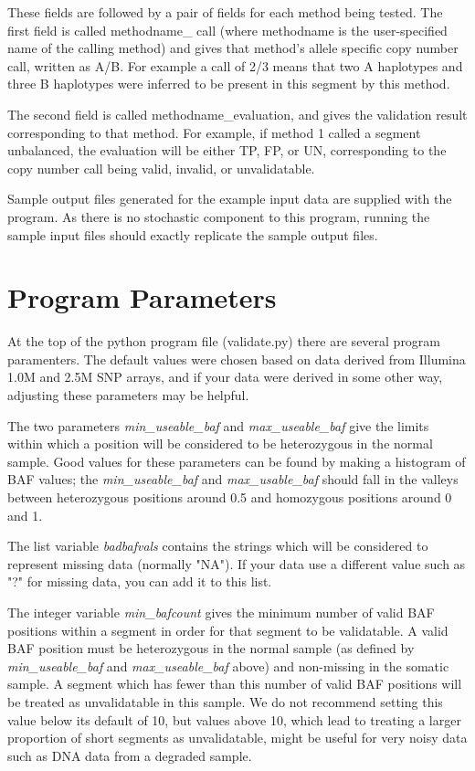 \documentclass{article}
\begin{document}
These fields are followed by a pair of fields for each method being
tested.  The first field is called methodname\_ call (where
methodname is the user-specified name of the calling method) 
and gives that method's allele specific copy
number call, written as A/B.  For example a call of 2/3 means that two
A haplotypes and three B haplotypes were inferred to be present in
this segment by this method.

The second field is called methodname\_evaluation,
and gives the
validation result corresponding to that method.  For example, if
method 1 called a segment unbalanced, the evaluation will
be either TP, FP, or UN, corresponding to the copy number call being
valid, invalid, or unvalidatable.

Sample output files generated for the example input data are supplied
with the program.  As there is no stochastic component to this
program, running the sample input files should exactly replicate the
sample output files.

\section*{Program Parameters}

At the top of the python program file (validate.py) there are several 
program paramenters.
The default values were chosen based
on data derived from Illumina 1.0M and 2.5M SNP arrays, and if your
data were derived in some other way, adjusting these parameters may
be helpful.

The two parameters {\it min\_useable\_baf} and {\it max\_useable\_baf}
 give the
limits within which a position will be considered to be heterozygous
in the normal sample.  Good values for these parameters can be
found by making a histogram of BAF values; the {\it min\_useable\_baf} and
{\it max\_usable\_baf} should fall in the valleys between heterozygous
positions around 0.5 and homozygous positions around 0 and 1.

The list variable {\it badbafvals} contains the strings which will be
considered to represent missing data (normally "NA").  If your data
use a different value such as "?" for missing data, you can add it
to this list.

The integer variable {\it min\_bafcount} gives the minimum number 
of valid BAF
positions within a segment in order for that segment to be
validatable.  A valid BAF position must be heterozygous in the
normal sample (as defined by {\it min\_useable\_baf} and 
{\it max\_useable\_baf}
above) and non-missing in the somatic sample.  A segment which has
fewer than this number of valid BAF positions will be treated as
unvalidatable in this sample.  We do not recommend setting this
value below its default of 10, but values above 10, which lead to 
treating a larger proportion of short segments as unvalidatable, 
might be useful for very noisy data such as DNA data from a degraded
sample.
\end{document}
